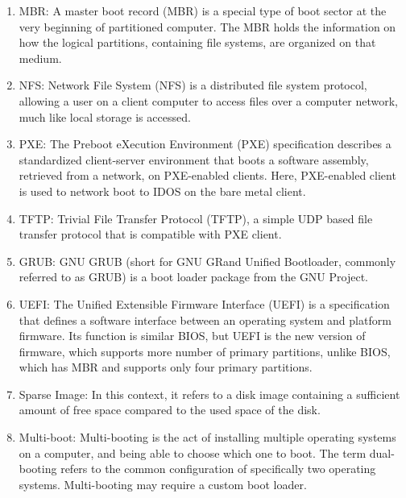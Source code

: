 \documentclass[a4paper,12pt]{article}
\begin{document}
\begin{enumerate}
     \item MBR: A master boot record (MBR) is a special type of boot sector at the very beginning of partitioned computer. The MBR holds the information on how the logical partitions, containing file systems, are organized on that medium.
    \item NFS: Network File System (NFS) is a distributed file system protocol, allowing a user on a client computer to access files over a computer network, much like local storage is accessed.
    \item PXE: The Preboot eXecution Environment (PXE) specification describes a standardized client-server environment that boots a software assembly, retrieved from a network, on PXE-enabled clients. Here, PXE-enabled client is used to network boot to IDOS on the bare metal client.
    \item TFTP: Trivial File Transfer Protocol (TFTP), a simple UDP based file transfer protocol that is compatible with PXE client.
    \item GRUB: GNU GRUB (short for GNU GRand Unified Bootloader, commonly referred to as GRUB) is a boot loader package from the GNU Project. 
    \item UEFI: The Unified Extensible Firmware Interface (UEFI) is a specification that defines a software interface between an operating system and platform firmware. Its function is similar BIOS, but UEFI is the new version of firmware, which supports more number of primary partitions, unlike  BIOS, which has MBR and supports only four primary partitions.
    \item Sparse Image: In this context, it refers to a disk image containing a sufficient amount of free space compared to the used space of the disk.
    \item Multi-boot: Multi-booting is the act of installing multiple operating systems on a computer, and being able to choose which one to boot. The term dual-booting refers to the common configuration of specifically two operating systems. Multi-booting may require a custom boot loader. 
\end{enumerate}
\end{document}
